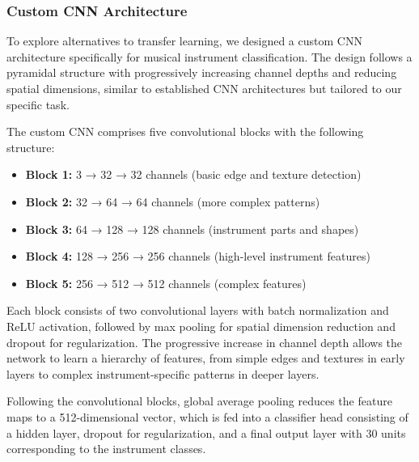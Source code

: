 
\subsubsection{Custom CNN Architecture}
To explore alternatives to transfer learning, we designed a custom CNN architecture specifically for musical instrument classification. The design follows a pyramidal structure with progressively increasing channel depths and reducing spatial dimensions, similar to established CNN architectures but tailored to our specific task.

The custom CNN comprises five convolutional blocks with the following structure:
\begin{itemize}
    \item \textbf{Block 1:} 3 → 32 → 32 channels (basic edge and texture detection)
    \item \textbf{Block 2:} 32 → 64 → 64 channels (more complex patterns)
    \item \textbf{Block 3:} 64 → 128 → 128 channels (instrument parts and shapes)
    \item \textbf{Block 4:} 128 → 256 → 256 channels (high-level instrument features)
    \item \textbf{Block 5:} 256 → 512 → 512 channels (complex features)
\end{itemize}

Each block consists of two convolutional layers with batch normalization and ReLU activation, followed by max pooling for spatial dimension reduction and dropout for regularization. The progressive increase in channel depth allows the network to learn a hierarchy of features, from simple edges and textures in early layers to complex instrument-specific patterns in deeper layers.

Following the convolutional blocks, global average pooling reduces the feature maps to a 512-dimensional vector, which is fed into a classifier head consisting of a hidden layer, dropout for regularization, and a final output layer with 30 units corresponding to the instrument classes.

